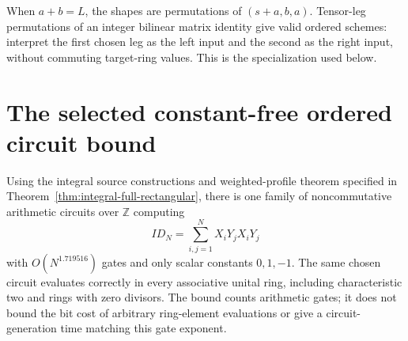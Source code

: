 When $a+b=L$, the shapes are permutations of
$(s+a,b,a)$. Tensor-leg permutations of an integer bilinear matrix
identity give valid ordered schemes: interpret the first chosen leg
as the left input and the second as the right input, without commuting
target-ring values. This is the specialization used below.

\section{The selected constant-free ordered circuit bound}
\begin{theorem}
\label{thm:selected-crossing}
Using the integral source constructions and weighted-profile theorem
specified in Theorem~\ref{thm:integral-full-rectangular}, there is one
family of noncommutative arithmetic circuits over $\mathbb Z$ computing
\[
 ID_N=\sum_{i,j=1}^{N}X_iY_jX_iY_j
\]
with $O(N^{1.719516})$ gates and only scalar constants $0,1,-1$.
The same chosen circuit evaluates correctly in every associative
unital ring, including characteristic two and rings with zero divisors.
The bound counts arithmetic gates; it does not bound the bit cost of
arbitrary ring-element evaluations or give a circuit-generation time
matching this gate exponent.
\end{theorem}
